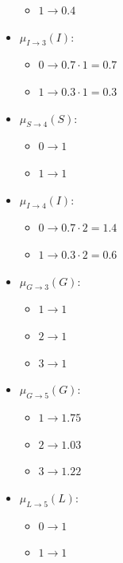 \begin{example}
\begin{itemize}
\begin{itemize}
                \item $1 \rightarrow 0.4$
            \end{itemize}
        \item $\mu_{I \rightarrow 3}(I)$:
            \begin{itemize}
                \item $0 \rightarrow 0.7 \cdot 1=0.7$
                \item $1 \rightarrow 0.3 \cdot 1=0.3$
            \end{itemize}
        \item $\mu_{S \rightarrow 4}(S)$: 
            \begin{itemize}
                \item $0 \rightarrow 1$
                \item $1 \rightarrow 1$
            \end{itemize}
        \item $\mu_{I \rightarrow 4}(I)$:
            \begin{itemize}
                \item $0 \rightarrow 0.7 \cdot 2=1.4$
                \item $1 \rightarrow 0.3 \cdot 2=0.6$
            \end{itemize}
        \item $\mu_{G \rightarrow 3}(G)$:
            \begin{itemize}
                \item $1 \rightarrow 1$
                \item $2 \rightarrow 1$
                \item $3 \rightarrow 1$
            \end{itemize}
        \item $\mu_{G \rightarrow 5}(G)$:
            \begin{itemize}
                \item $1 \rightarrow 1.75$
                \item $2 \rightarrow 1.03$
                \item $3 \rightarrow 1.22$
            \end{itemize}
        \item $\mu_{L \rightarrow 5}(L)$:
            \begin{itemize}
                \item $0 \rightarrow 1$
                \item $1 \rightarrow 1$
            \end{itemize}

\end{itemize}
\end{example}
